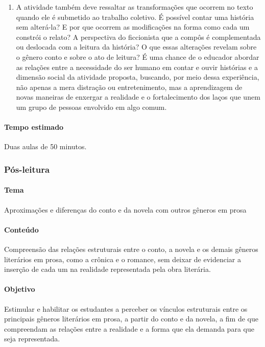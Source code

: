\documentclass[12pt]{extarticle}
\begin{document}
\begin{enumerate}
\item
A atividade também deve ressaltar as transformações que ocorrem no
texto quando ele é submetido ao trabalho coletivo. É possível contar uma
história sem alterá-la? E por que ocorrem as modificações na forma como
cada um constrói o relato? A perspectiva do ficcionista que a compôs é
complementada ou deslocada com a leitura da história? O que essas
alterações revelam sobre o gênero conto e sobre o ato de leitura? É uma
chance de o educador abordar as relações entre a necessidade do ser
humano em contar e ouvir histórias e a dimensão social da atividade
proposta, buscando, por meio dessa experiência, não apenas a mera
distração ou entretenimento, mas a aprendizagem de novas maneiras de
enxergar a realidade e o fortalecimento dos laços que unem um grupo de
pessoas envolvido em algo comum.
\end{enumerate}

\paragraph{Tempo estimado} Duas aulas de 50 minutos.



\subsubsection{Pós-leitura}


\paragraph{Tema} Aproximações e diferenças do conto e da novela 
com outros gêneros em prosa 

\paragraph{Conteúdo} Compreensão das relações estruturais entre o conto, a
novela e os demais gêneros literários em prosa, como a crônica e o
romance, sem deixar de evidenciar a inserção de cada um na realidade
representada pela obra literária.

\paragraph{Objetivo} Estimular e habilitar os estudantes a perceber os
vínculos estruturais entre os principais gêneros literários em prosa, a
partir do conto e da novela, a fim de que compreendam as relações entre
a realidade e a forma que ela demanda para que seja representada.
\end{document}
